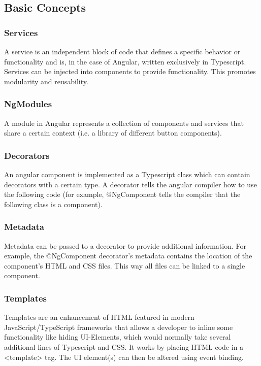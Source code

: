 \subsection {Basic Concepts}

\subsubsection {Services}
A service is an independent block of code that defines a specific behavior or functionality and is, in the case of Angular, written exclusively in Typescript. Services can be injected into components to provide functionality. This promotes modularity and reusability.

\subsubsection{NgModules}
A module in Angular represents a collection of components and services that share a certain context (i.e. a library of different button components).

\subsubsection{Decorators}
An angular component is implemented as a Typescript class which can contain decorators with a certain type. A decorator tells the angular compiler how to use the following code (for example, @NgComponent tells the compiler that the following class is a component).

\subsubsection{Metadata}
Metadata can be passed to a decorator to provide additional information. For example, the @NgComponent decorator’s metadata contains the location of the component’s HTML and CSS files. This way all files can be linked to a single component.

\subsubsection{Templates}
Templates are an enhancement of HTML featured in modern JavaScript/TypeScript frameworks that allows a developer to inline some functionality like hiding UI-Elements, which would normally take several additional lines of Typescript and CSS. It works by placing HTML code in a <template> tag. The UI element(s) can then be altered using event binding.

